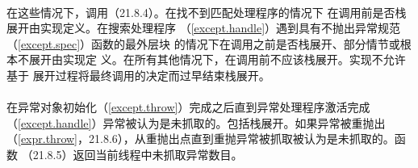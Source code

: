 \paragraph{}
在这些情况下，调用（21.8.4）。在找不到匹配处理程序的情况下
在调用前是否栈展开由实现定义。在搜索处理程序
（\ref{except.handle}）遇到具有不抛出异常规范（\ref{except.spec}）函数的最外层块
的情况下在调用之前是否栈展开、部分情节或根本不展开由实现定
义。在所有其他情况下，在调用前不应该栈展开。实现不允许基于
展开过程将最终调用的决定而过早结束栈展开。

\paragraph{}
在异常对象初始化（\ref{except.throw}）完成之后直到异常处理程序激活完成
（\ref{except.handle}）异常被认为是未抓取的。包括栈展开。如果异常被重抛出
（\ref{expr.throw}，21.8.6），从重抛出点直到重抛异常被抓取被认为是未抓取的。函数
（21.8.5）返回当前线程中未抓取异常数目。
